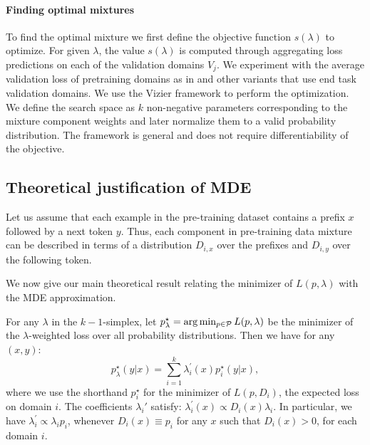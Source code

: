 \paragraph{Finding optimal mixtures}

To find the optimal mixture we first define the objective function $s(\lambda)$ to optimize. For given $\lambda$, the value $s(\lambda)$ is computed through aggregating loss predictions on each of the validation domains $V_j$.  We experiment with the average validation loss of pretraining domains as in \citet{DOGE} and other variants that use end task validation domains. We use the Vizier framework \cite{vizier} to perform the optimization. We define the search space as $k$ non-negative parameters corresponding to the mixture component weights and later normalize them to a valid probability distribution. The framework is general and does not require differentiability of the objective.



\subsection{Theoretical justification of MDE}
\label{sec:theory}

Let us assume that each example in the pre-training dataset
contains a prefix $x$ followed by a next token $y$. Thus, each component in pre-training data mixture can be described in terms of a distribution $D_{i,x}$ over the prefixes and $D_{i,y}$ over the following token.%

We now give our main theoretical result relating the minimizer of $L(p, \lambda)$ with the MDE approximation.

\begin{proposition}
    For any $\lambda$ in the $k-1$-simplex, let $p^\star_\lambda = \arg\min_{p\in\mathcal{P}} L(p, \lambda)$ be the minimizer of the $\lambda$-weighted loss over all probability distributions. Then we have for any $(x,y)$: 
    \begin{equation*}
        p^\star_\lambda(y|x) = \sum_{i=1}^k \lambda_i^{'}(x) p^\star_i(y|x),
    \end{equation*}
    where we use the shorthand $p^\star_i$ for the minimizer of $L(p, D_i)$, the expected loss on domain $i$. The coefficients $\lambda_i'$ satisfy: $\lambda_i^{'}(x) \propto D_i(x)\lambda_i$.
    In particular, we have $\lambda^{'}_i \propto \lambda_i p_i$, whenever $D_i(x) \equiv p_i$ for any $x$ such that $D_i(x) > 0$, for each domain $i$. 
    \label{prop:mde}
\end{proposition}


